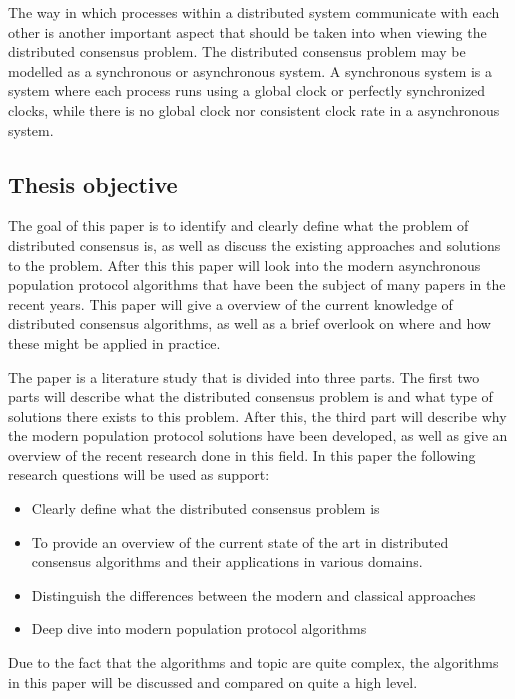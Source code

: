 The way in which processes within a distributed system communicate with each other is another important aspect that should be taken into when viewing the distributed consensus problem. The distributed consensus problem may be modelled as a synchronous or asynchronous system. A synchronous system is a system where each process runs using a global clock or perfectly synchronized clocks, while there is no global clock nor consistent clock rate in a asynchronous system.


\clearpage

\subsection{Thesis objective}
The goal of this paper is to identify and clearly define what the problem of distributed consensus is,
as well as discuss the existing approaches and solutions to the problem. After this this paper will look into the modern asynchronous population protocol algorithms that have been the subject of many papers in the recent years. 
This paper will give a overview of the current knowledge of distributed consensus algorithms, as well as a brief overlook on where and how these might be applied in practice.

The paper is a literature study that is divided into three parts. The first two parts will describe what the distributed consensus problem is and what type of solutions there exists to this problem. After this, the third part will describe why the modern population protocol solutions have been developed, as well as give an overview of the recent research done in this field. In this paper the following research questions will be used as support:

\begin{itemize}
    \item Clearly define what the distributed consensus problem is
    \item To provide an overview of the current state of the art in distributed consensus algorithms and their applications in various domains.
    \item Distinguish the differences between the modern and classical approaches
    \item Deep dive into modern population protocol algorithms
\end{itemize}

Due to the fact that the algorithms and topic are quite complex, the algorithms in this paper will be discussed and compared on quite a high level.

\subsection{}

\clearpage